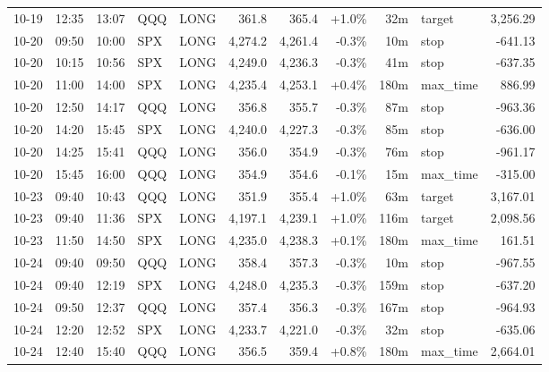 \documentclass[11pt,a4paper,twoside]{article}
\begin{document}
\begin{center}
\begin{longtable}{>{\color{txtmain}}l l l l l r r r r >{\color{txtmain}}l r}
10-19 & 12:35 & 13:07 & QQQ & LONG & 361.8 & 365.4 & \textcolor{wingreen}{+1.0\%} & 32m & target & \textcolor{wingreen}{3,256.29} \\
10-20 & 09:50 & 10:00 & SPX & LONG & 4,274.2 & 4,261.4 & \textcolor{lossred}{-0.3\%} & 10m & stop & \textcolor{lossred}{-641.13} \\
10-20 & 10:15 & 10:56 & SPX & LONG & 4,249.0 & 4,236.3 & \textcolor{lossred}{-0.3\%} & 41m & stop & \textcolor{lossred}{-637.35} \\
10-20 & 11:00 & 14:00 & SPX & LONG & 4,235.4 & 4,253.1 & \textcolor{wingreen}{+0.4\%} & 180m & max\_time & \textcolor{wingreen}{886.99} \\
10-20 & 12:50 & 14:17 & QQQ & LONG & 356.8 & 355.7 & \textcolor{lossred}{-0.3\%} & 87m & stop & \textcolor{lossred}{-963.36} \\
10-20 & 14:20 & 15:45 & SPX & LONG & 4,240.0 & 4,227.3 & \textcolor{lossred}{-0.3\%} & 85m & stop & \textcolor{lossred}{-636.00} \\
10-20 & 14:25 & 15:41 & QQQ & LONG & 356.0 & 354.9 & \textcolor{lossred}{-0.3\%} & 76m & stop & \textcolor{lossred}{-961.17} \\
10-20 & 15:45 & 16:00 & QQQ & LONG & 354.9 & 354.6 & \textcolor{lossred}{-0.1\%} & 15m & max\_time & \textcolor{lossred}{-315.00} \\
10-23 & 09:40 & 10:43 & QQQ & LONG & 351.9 & 355.4 & \textcolor{wingreen}{+1.0\%} & 63m & target & \textcolor{wingreen}{3,167.01} \\
10-23 & 09:40 & 11:36 & SPX & LONG & 4,197.1 & 4,239.1 & \textcolor{wingreen}{+1.0\%} & 116m & target & \textcolor{wingreen}{2,098.56} \\
10-23 & 11:50 & 14:50 & SPX & LONG & 4,235.0 & 4,238.3 & \textcolor{wingreen}{+0.1\%} & 180m & max\_time & \textcolor{wingreen}{161.51} \\
10-24 & 09:40 & 09:50 & QQQ & LONG & 358.4 & 357.3 & \textcolor{lossred}{-0.3\%} & 10m & stop & \textcolor{lossred}{-967.55} \\
10-24 & 09:40 & 12:19 & SPX & LONG & 4,248.0 & 4,235.3 & \textcolor{lossred}{-0.3\%} & 159m & stop & \textcolor{lossred}{-637.20} \\
10-24 & 09:50 & 12:37 & QQQ & LONG & 357.4 & 356.3 & \textcolor{lossred}{-0.3\%} & 167m & stop & \textcolor{lossred}{-964.93} \\
10-24 & 12:20 & 12:52 & SPX & LONG & 4,233.7 & 4,221.0 & \textcolor{lossred}{-0.3\%} & 32m & stop & \textcolor{lossred}{-635.06} \\
10-24 & 12:40 & 15:40 & QQQ & LONG & 356.5 & 359.4 & \textcolor{wingreen}{+0.8\%} & 180m & max\_time & \textcolor{wingreen}{2,664.01} \\

\end{longtable}
\end{center}
\end{document}
